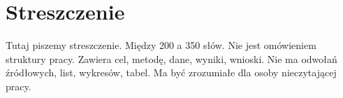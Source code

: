 \documentclass[12pt,a4paper,twoside,openany]{book}
\begin{document}
\clearpage

\chapter*{Streszczenie}

Tutaj piszemy streszczenie. Między 200 a 350 słów. Nie jest omówieniem struktury pracy. Zawiera cel, metodę, dane, wyniki, wnioski. Nie ma odwołań źródłowych, list, wykresów, tabel. Ma być zrozumiałe dla osoby nieczytającej pracy.
\end{document}
